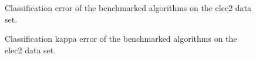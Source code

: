 \documentclass[10pt, conference]{IEEEtran}
\begin{document}
\begin{figure}
\centering
{}
\caption{Classification error of the benchmarked algorithms on the elec2 data set.}
\end{figure}

\begin{figure}[h]
\centering
{}
\caption{Classification kappa error of the benchmarked algorithms on the elec2 data set.}
\end{figure}
\end{document}
